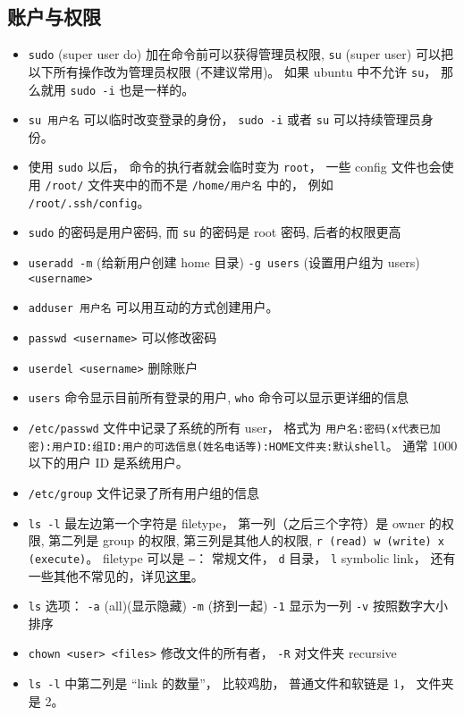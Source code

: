 \subsection{账户与权限}
\begin{itemize}
\item \verb`sudo` (super user do) 加在命令前可以获得管理员权限, \verb`su` (super user) 可以把以下所有操作改为管理员权限 (不建议常用)。 如果 ubuntu 中不允许 \verb|su|， 那么就用 \verb|sudo -i| 也是一样的。
\item \verb`su 用户名` 可以临时改变登录的身份， \verb|sudo -i| 或者 \verb|su| 可以持续管理员身份。
\item 使用 \verb|sudo| 以后， 命令的执行者就会临时变为 \verb|root|， 一些 config 文件也会使用 \verb|/root/| 文件夹中的而不是 \verb|/home/用户名| 中的， 例如 \verb|/root/.ssh/config|。
\item \verb`sudo` 的密码是用户密码, 而 \verb`su` 的密码是 root 密码, 后者的权限更高
\item \verb`useradd -m` (给新用户创建 home 目录) \verb`-g users` (设置用户组为 users) \verb`<username>`
\item \verb|adduser 用户名| 可以用互动的方式创建用户。
\item \verb`passwd <username>` 可以修改密码
\item \verb`userdel <username>` 删除账户
\item \verb`users` 命令显示目前所有登录的用户, \verb`who` 命令可以显示更详细的信息
\item \verb`/etc/passwd` 文件中记录了系统的所有 user， 格式为 \verb|用户名:密码(x代表已加密):用户ID:组ID:用户的可选信息(姓名电话等):HOME文件夹:默认shell|。 通常 1000 以下的用户 ID 是系统用户。
\item \verb|/etc/group| 文件记录了所有用户组的信息
\item \verb`ls -l` 最左边第一个字符是 filetype， 第一列（之后三个字符）是 owner 的权限, 第二列是 group 的权限, 第三列是其他人的权限, \verb`r (read) w (write) x (execute)`。 filetype 可以是 \verb|–|： 常规文件， \verb|d| 目录， \verb|l| symbolic link， 还有一些其他不常见的，详见\href{https://linuxconfig.org/identifying-file-types-in-linux}{这里}。
\item \verb`ls` 选项： \verb`-a` (all)(显示隐藏) \verb`-m` (挤到一起) \verb`-1` 显示为一列 \verb`-v` 按照数字大小排序
\item \verb`chown <user> <files>` 修改文件的所有者， \verb|-R| 对文件夹 recursive
\item \verb|ls -l| 中第二列是 “link 的数量”， 比较鸡肋， 普通文件和软链是 1， 文件夹是 2。

\end{itemize}
